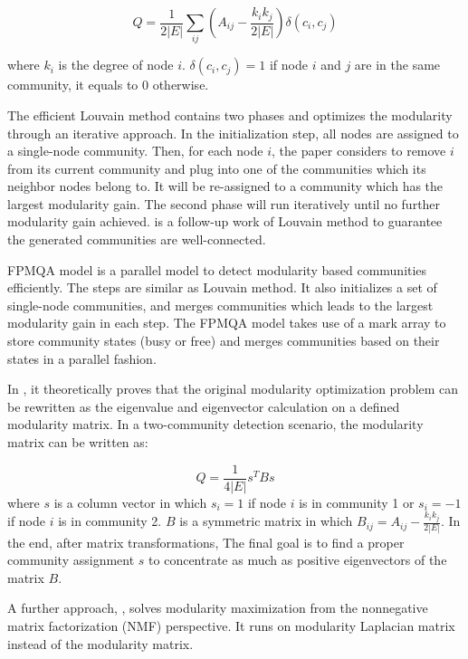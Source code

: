\begin{equation}
	Q = \frac{1}{2|E|}\sum_{ij}(A_{ij} - \frac{k_ik_j}{2|E|})\delta(c_i,c_j)
\end{equation}

where   $k_i$ is the degree of node $i$.  $\delta(c_i,c_j) = 1$ if node $i$ and $j$ are in the same community, it equals to 0 otherwise.

The efficient Louvain method contains two phases and optimizes the modularity through an iterative approach. In the initialization step, all nodes are assigned to a single-node community. Then, for each node $i$, the paper considers to remove $i$ from its current community and plug into one of the communities which its neighbor nodes belong to. It will be re-assigned to a community which has the largest modularity gain. The second phase will run iteratively until no further modularity gain achieved. \cite{traag2019louvain} is a follow-up work of Louvain method to guarantee the generated communities are well-connected.

FPMQA model \cite{bu2013fast} is a parallel model to detect modularity based communities efficiently. The steps are similar as Louvain method. It also initializes a set of single-node communities, and merges communities which leads to the largest modularity gain in each step. The FPMQA model takes use of a mark array to store community states (busy or free) and merges communities based on their states in a parallel fashion.

In  \cite{newman2006modularity}, it theoretically proves that the original modularity optimization problem can be rewritten as the eigenvalue and eigenvector calculation on a defined modularity matrix. In a two-community detection scenario,  the modularity matrix can be written as:

\begin{equation}
Q = \frac{1}{4|E|}s^TBs
\end{equation}
where $s$ is a column vector in which $s_i = 1$ if node $i$ is in community 1 or $s_i = -1$ if node $i$ is in community 2. $B$ is a symmetric matrix in which $B_{ij} = A_{ij} - \frac{k_ik_j}{2|E|}$. In the end, after matrix transformations, The final goal is to find a proper community assignment $s$ to concentrate as much as positive eigenvectors of the matrix $B$.

A further approach, \cite{jiang2012modularity}, solves modularity maximization from the nonnegative matrix factorization (NMF) perspective. It runs on modularity Laplacian matrix instead of the modularity matrix.  

